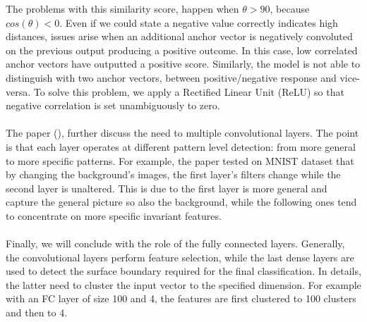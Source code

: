 \documentclass[LaM,binding=0.6cm]{sapthesis}
\begin{document}
The problems with this similarity score, happen when $\theta>90$, because $cos(\theta)<0$. Even if we could state a negative value correctly indicates high distances, issues arise when an additional anchor vector is negatively convoluted on the previous output producing a positive outcome. In this case, low correlated anchor vectors have outputted a positive score. Similarly, the model is not able to distinguish with two anchor vectors, between positive/negative response and vice-versa. To solve this problem, we apply a Rectified Linear Unit (ReLU) so that negative correlation is set unambiguously to zero.\\\\The paper (\cite{cnninter}), further discuss the need to multiple convolutional layers. The point is that each layer operates at different pattern level detection: from more general to more specific patterns. For example, the paper tested on MNIST dataset that by changing the background's images, the first layer's filters change while the second layer is unaltered. This is due to the first layer is more general and capture the general picture so also the background, while the following ones tend to concentrate on more specific invariant features.\\\\Finally, we will conclude with the role of the fully connected layers. Generally, the convolutional layers perform feature selection, while the last dense layers are used to detect the surface boundary required for the final classification. In details, the latter need to cluster the input vector to the specified dimension. For example with an FC layer of size 100 and 4, the features are first clustered to 100 clusters and then to 4.
\end{document}

